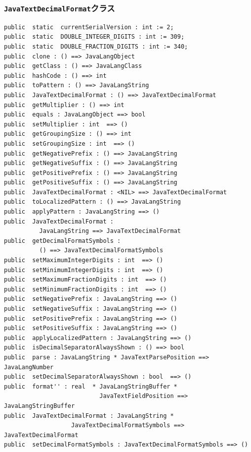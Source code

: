 \documentclass[\pformat,12pt]{jarticle}
\begin{document}
\subsubsection{\texttt{JavaTextDecimalFormat}クラス}
\begin{small}
\begin{verbatim}
public  static  currentSerialVersion : int := 2;
public  static  DOUBLE_INTEGER_DIGITS : int := 309;
public  static  DOUBLE_FRACTION_DIGITS : int := 340;
public  clone : () ==> JavaLangObject
public  getClass : () ==> JavaLangClass
public  hashCode : () ==> int
public  toPattern : () ==> JavaLangString
public  JavaTextDecimalFormat : () ==> JavaTextDecimalFormat
public  getMultiplier : () ==> int
public  equals : JavaLangObject ==> bool
public  setMultiplier : int  ==> ()
public  getGroupingSize : () ==> int
public  setGroupingSize : int  ==> ()
public  getNegativePrefix : () ==> JavaLangString
public  getNegativeSuffix : () ==> JavaLangString
public  getPositivePrefix : () ==> JavaLangString
public  getPositiveSuffix : () ==> JavaLangString
public  JavaTextDecimalFormat : <NIL> ==> JavaTextDecimalFormat
public  toLocalizedPattern : () ==> JavaLangString
public  applyPattern : JavaLangString ==> ()
public  JavaTextDecimalFormat : 
          JavaLangString ==> JavaTextDecimalFormat
public  getDecimalFormatSymbols : 
          () ==> JavaTextDecimalFormatSymbols
public  setMaximumIntegerDigits : int  ==> ()
public  setMinimumIntegerDigits : int  ==> ()
public  setMaximumFractionDigits : int  ==> ()
public  setMinimumFractionDigits : int  ==> ()
public  setNegativePrefix : JavaLangString ==> ()
public  setNegativeSuffix : JavaLangString ==> ()
public  setPositivePrefix : JavaLangString ==> ()
public  setPositiveSuffix : JavaLangString ==> ()
public  applyLocalizedPattern : JavaLangString ==> ()
public  isDecimalSeparatorAlwaysShown : () ==> bool
public  parse : JavaLangString * JavaTextParsePosition ==> JavaLangNumber
public  setDecimalSeparatorAlwaysShown : bool  ==> ()
public  format'' : real  * JavaLangStringBuffer * 
                           JavaTextFieldPosition ==> JavaLangStringBuffer
public  JavaTextDecimalFormat : JavaLangString * 
                   JavaTextDecimalFormatSymbols ==> JavaTextDecimalFormat
public  setDecimalFormatSymbols : JavaTextDecimalFormatSymbols ==> ()
\end{verbatim}
\end{small}
\end{document}
